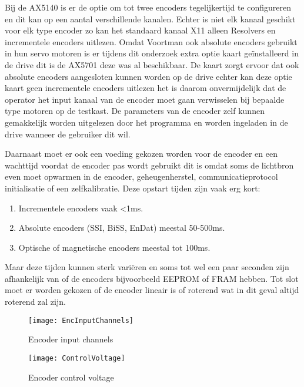 Bij de \gls{AX5140} is er de optie om tot twee encoders tegelijkertijd te configureren en dit kan op een aantal verschillende kanalen. Echter is niet elk kanaal geschikt voor elk type encoder zo kan het standaard kanaal X11 alleen Resolvers en incrementele encoders uitlezen. Omdat Voortman ook absolute encoders gebruikt in hun servo motoren is er tijdens dit onderzoek extra optie kaart geïnstalleerd in de drive dit is de \gls{AX5701} deze was al beschikbaar. De kaart zorgt ervoor dat ook absolute encoders aangesloten kunnen worden op de drive echter kan deze optie kaart geen incrementele encoders uitlezen het is daarom onvermijdelijk dat de operator het input kanaal van de encoder moet gaan verwisselen bij bepaalde type motoren op de testkast. De parameters van de encoder zelf kunnen gemakkelijk worden uitgelezen door het programma en worden ingeladen in de drive wanneer de gebruiker dit wil.

\vspace{0.5cm}

Daarnaast moet er ook een voeding gekozen worden voor de encoder en een wachttijd voordat de encoder pas wordt gebruikt dit is omdat soms de lichtbron even moet opwarmen in de encoder, geheugenherstel, communicatieprotocol initialisatie of een zelfkalibratie. Deze opstart tijden zijn vaak erg kort:

\begin{enumerate}
	\item Incrementele encoders vaak <1ms.
	\item Absolute encoders (\gls{SSI}, BiSS, EnDat) meestal 50-500ms.
	\item Optische of magnetische encoders meestal tot 100ms.
\end{enumerate}

Maar deze tijden kunnen sterk variëren en soms tot wel een paar seconden zijn afhankelijk van of de encoders bijvoorbeeld \gls{EEPROM} of \gls{FRAM} hebben. Tot slot moet er worden gekozen of de encoder lineair is of roterend wat in dit geval altijd roterend zal zijn.

\begin{figure}[H]
	\centering
	\texttt{[image: EncInputChannels]}
	\label{fig:EncoderInputChannel}
	\caption{Encoder input channels}
\end{figure}

\begin{figure}[H]
	\centering
	\texttt{[image: ControlVoltage]}
	\label{fig:ControlVoltage}
	\caption{Encoder control voltage}
\end{figure}


